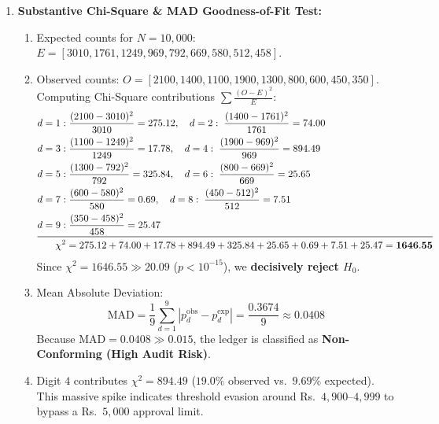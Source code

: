 \begin{enumerate}[label=\textbf{P5.\arabic*}]
    \item \textbf{Substantive Chi-Square \& MAD Goodness-of-Fit Test:}
    \begin{enumerate}[label=(\alph*)]
        \item Expected counts for $N = 10{,}000$:
        $E = [3010, 1761, 1249, 969, 792, 669, 580, 512, 458]$.
        \item Observed counts: $O = [2100, 1400, 1100, 1900, 1300, 800, 600, 450, 350]$.
        Computing Chi-Square contributions $\sum \frac{(O - E)^2}{E}$:
        \begin{align*}
        d=1: &\; \frac{(2100 - 3010)^2}{3010} = 275.12, \quad d=2: \; \frac{(1400 - 1761)^2}{1761} = 74.00 \\
        d=3: &\; \frac{(1100 - 1249)^2}{1249} = 17.78, \quad d=4: \; \frac{(1900 - 969)^2}{969} = 894.49 \\
        d=5: &\; \frac{(1300 - 792)^2}{792} = 325.84, \quad d=6: \; \frac{(800 - 669)^2}{669} = 25.65 \\
        d=7: &\; \frac{(600 - 580)^2}{580} = 0.69, \quad d=8: \; \frac{(450 - 512)^2}{512} = 7.51 \\
        d=9: &\; \frac{(350 - 458)^2}{458} = 25.47 \\
        \midrule
        \chi^2 &= 275.12 + 74.00 + 17.78 + 894.49 + 325.84 + 25.65 + 0.69 + 7.51 + 25.47 = \mathbf{1646.55}
        \end{align*}
        Since $\chi^2 = 1646.55 \gg 20.09$ ($p < 10^{-15}$), we \textbf{decisively reject $H_0$}.
        \item Mean Absolute Deviation:
        \begin{equation*}
        \text{MAD} = \frac{1}{9} \sum_{d=1}^9 |p_d^{\text{obs}} - p_d^{\text{exp}}| = \frac{0.3674}{9} \approx \mathbf{0.0408}
        \end{equation*}
        Because $\text{MAD} = 0.0408 \gg 0.015$, the ledger is classified as \textbf{Non-Conforming (High Audit Risk)}.
        \item Digit $4$ contributes $\chi^2 = 894.49$ ($19.0\%$ observed vs.~$9.69\%$ expected). This massive spike indicates threshold evasion around Rs.~$4{,}900$--$4{,}999$ to bypass a Rs.~$5{,}000$ approval limit.
    \end{enumerate}


\end{enumerate}
